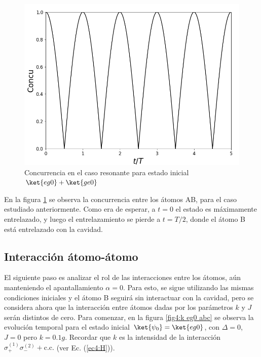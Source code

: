 \begin{figure}[H]
    \begin{minipage}[c]{0.67\textwidth}
        \includegraphics[width=\textwidth]{figuras/ch4/d eg0+ concu d=0.png}
    \end{minipage}\hfill
    \begin{minipage}[c]{0.3\textwidth}
    \caption{Concurrencia en el caso resonante para estado inicial $\ket{eg0}+\ket{ge0}$} 
    \label{fig4:concu eg0 sim}
  \end{minipage}
\end{figure}
En la figura \ref{fig4:concu eg0 sim} se observa la concurrencia entre los átomos AB, para el caso estudiado anteriormente. Como era de esperar, a $t=0$ el estado es máximamente entrelazado, y luego el entrelazamiento se pierde a $t=T/2$, donde el átomo B está entrelazado con la cavidad. 

\subsection{Interacción átomo-átomo}

El siguiente paso es analizar el rol de las interacciones entre los átomos, aún manteniendo el apantallamiento $\alpha=0$. Para esto, se sigue utilizando las mismas condiciones iniciales y el átomo B seguirá sin interactuar con la cavidad, pero se considera ahora que la interacción entre átomos dadas por los parámetros $k$ y $J$ serán distintos de cero. Para comenzar, en la figura \ref{fig4:k eg0 abc} se observa la evolución temporal para el estado inicial $\ket{\psi_0}=\ket{eg0}$, con $\Delta = 0$, $J=0$ pero $k=0.1g$. Recordar que $k$ es la intensidad de la interacción $\sigma^{(1)}_+\sigma^{(2)}_-+\text{c.c.}$ (ver Ec. (\ref{ec4:H})).

